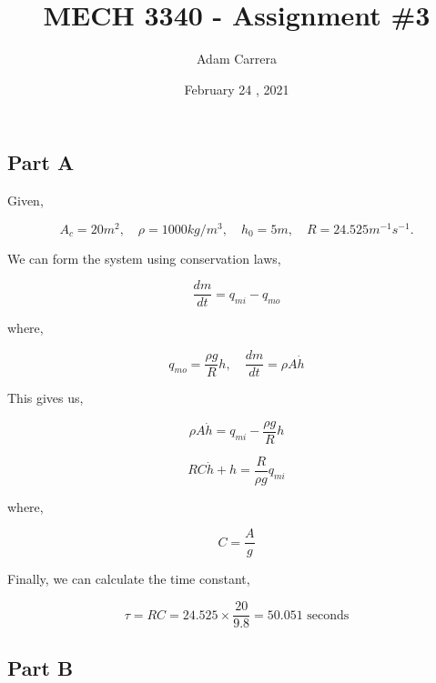 \documentclass[12pt]{article}
\author{Adam Carrera}
\date{February 24 , 2021}
\title{MECH 3340 - Assignment \#3}
\numberwithin{equation}{subsection}
\begin{document}
  \maketitle

  \section{}

  \subsection{Part A}

  Given,

  \[
      A_c = 20 m^2, \quad \rho = 1000 kg/m^3, \quad h_0 = 5m, \quad R = 24.525 m^{-1}s^{-1}
    .\]

  We can form the system using conservation laws,

  \begin{equation}
    \frac{dm}{dt} = q_{mi} - q_{mo}
  \end{equation}

  where,

  \begin{equation}
    q_{mo} = \frac{\rho g}{R}h, \quad \frac{dm}{dt} = \rho A \dot h
  \end{equation}

  This gives us,

  \begin{equation}
    \rho A \dot h = q_{mi} - \frac{\rho g}{R}h
  \end{equation}

  \begin{equation}
    RC \dot h + h = \frac{R}{\rho g}q_{mi}
  \end{equation}

  where,

  \begin{equation}
    C = \frac{A}{g}
  \end{equation}

  Finally, we can calculate the time constant,

  \begin{equation}
    \tau = RC = 24.525 \times \frac{20}{9.8} = 50.051 \text{ seconds}
  \end{equation}

  \subsection{Part B}
\end{document}
